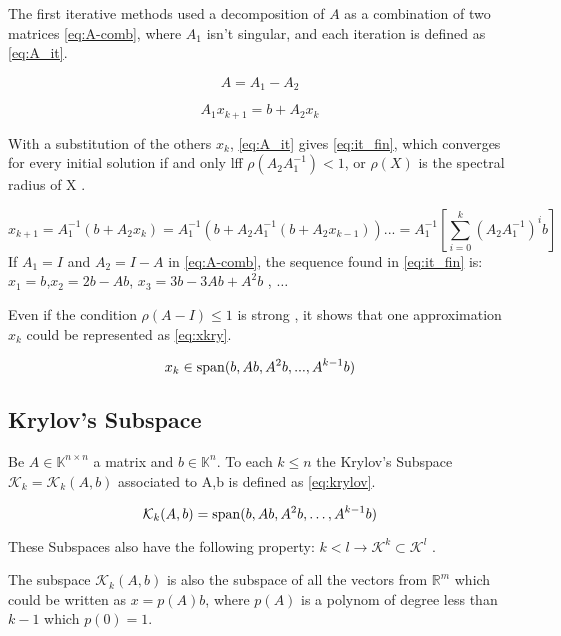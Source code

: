 The first iterative methods used a decomposition of $A$ as a combination of two matrices \ref{eq:A-comb}, where $A_{1}$ isn't singular, and each iteration is defined as \ref{eq:A_it}.

\begin{equation}\label{eq:A-comb}
    A = A_{1} - A_{2}
\end{equation}

\begin{equation}\label{eq:A_it}
    A_{1} x_{k+1} = b + A_{2}x_{k}
\end{equation}

With a substitution of the others $x_{k}$, \ref{eq:A_it} gives \ref{eq:it_fin}, which converges for every initial solution if and only lff $\rho(A_{2}A_{1}^{-1}) < 1$, or $\rho(X)$ is the spectral radius of X \cite{bonnet}.

\begin{equation}\label{eq:it_fin}
    x_{k+1} = A_{1}^{-1}(b + A_{2}x_{k}) = A_{1}^{-1}(b + A_{2}A_{1}^{-1}(b + A_{2}x_{k-1}))... = A_{1}^{-1} \left[ \sum_{i=0}^{k} (A_{2}A_{1}^{-1})^{i}b\right]
\end{equation}
If $A_{1} = I$ and $A_{2} = I - A$ in \ref{eq:A-comb}, the sequence found in \ref{eq:it_fin} is: $x_{1} = b$,$x_{2} = 2b- Ab$, $x_{3} = 3b-3Ab+A^{2}b$ , $\dots$

Even if the condition $\rho(A-I) \leq 1$ is strong \cite{bonnet}, it shows that one approximation $x_{k}$ could be represented as \ref{eq:xkry}.

\begin{equation}\label{eq:xkry}
    x_{k} \in \operatorname{span}(b,Ab,A^{2}b,...,A^{k-1}b)
\end{equation}

\subsection{Krylov's Subspace}
Be $A \in \mathbb{K}^{n \times n}$ a matrix and $b\in \mathbb{K}^{n}$. To each $k\leq n$ the Krylov's Subspace $\mathcal{K}_{k}=\mathcal{K}_{k}(A,b)$ associated to A,b is defined as \ref{eq:krylov}.

\begin{equation}\label{eq:krylov}
    \mathcal{K}_{k}(A,b) = \operatorname{span}(b,Ab,A^{2}b,\dots , A^{k-1}b)
\end{equation}

These Subspaces also have the following property: $k<l \to \mathcal{K}^{k} \subset \mathcal{K}^{l}$ \cite{bonnet}.

The subspace $\mathcal{K}_{k}(A,b)$ is also the subspace of all the vectors from $\mathbb{R}^{m}$ which could be written as $x=p(A)b$, where $p(A)$ is a polynom of degree less than $k-1$ which $p(0)=1$.

